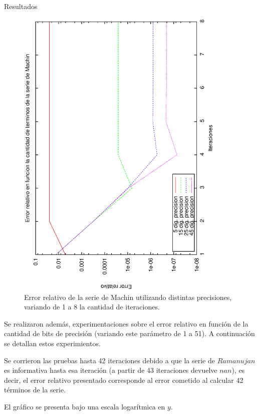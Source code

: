 \begin{section}{Resultados}
	\VSP	
	\begin{figure}[H]
	  \centering
		\includegraphics[width=10cm,angle=-90]{graficos/machin_1a8it.eps}
	  \caption{Error relativo de la serie de Machin utilizando distintas precisiones, variando de 1 a 8 la cantidad de iteraciones.}
	  \label{fig:machin_8it}
	\end{figure}
	
	\VSP	

	Se realizaron además, experimentaciones sobre el error relativo en función de la cantidad de bits de precisión (variando este parámetro de 1 a 51). A continuación se detallan estos experimientos.
	
	Se corrieron las pruebas hasta 42 iteraciones debido a que la serie de $Ramanujan$ es informativa hasta esa iteración (a partir de 43 iteraciones devuelve $nan$), es decir, el error relativo presentado corresponde al error cometido al calcular 42 términos de la serie.
	
	El gráfico se presenta bajo una escala logarítmica en $y$.
	

\end{section}
